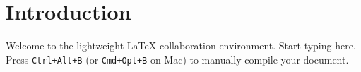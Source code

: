 \section{Introduction}
\label{sec:intro}

Welcome to the lightweight LaTeX collaboration environment. Start typing here. Press \texttt{Ctrl+Alt+B} (or \texttt{Cmd+Opt+B} on Mac) to manually compile your document.
